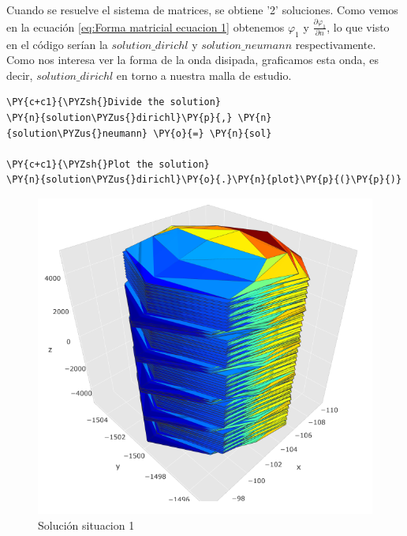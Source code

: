 Cuando se resuelve el sistema de matrices, se obtiene '2' soluciones. Como vemos en la ecuación \eqref{eq:Forma matricial ecuacion 1} obtenemos $\varphi_1$ y $\frac{\partial \varphi_1}{\partial n}$, lo que visto en el código serían la $solution\_dirichl$ y $solution\_neumann$ respectivamente. Como nos interesa ver la forma de la onda disipada, graficamos esta onda, es decir, $solution\_dirichl$ en torno a nuestra malla de estudio.
\begin{tcolorbox}
\begin{Verbatim}[commandchars=\\\{\}]
\PY{c+c1}{\PYZsh{}Divide the solution} 
\PY{n}{solution\PYZus{}dirichl}\PY{p}{,} \PY{n}{solution\PYZus{}neumann} \PY{o}{=} \PY{n}{sol}

\PY{c+c1}{\PYZsh{}Plot the solution} 
\PY{n}{solution\PYZus{}dirichl}\PY{o}{.}\PY{n}{plot}\PY{p}{(}\PY{p}{)}
\end{Verbatim}
\end{tcolorbox}
\begin{figure}[H]
\centering
\includegraphics[width=16cm]{Imagenes/graficas/Situacion 1/Solucion ecuacion 1/3d.png}
\caption{Solución situacion 1}
\end{figure}

